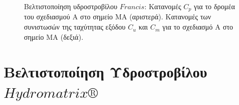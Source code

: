 \begin{figure}[h!]
\begin{minipage}[b]{0.5\linewidth}
 \centering
\end{minipage}
\begin{minipage}[b]{0.5\linewidth}
 \centering
\end{minipage}
\caption{Βελτιστοποίηση υδροστροβίλου $Francis$:  Κατανομές $C_p$ για το δρομέα του σχεδιασμού Α στο σημείο ΜΑ (αριστερά). Κατανομές των συνιστωσών της ταχύτητας εξόδου $C_u$ και $C_m$ για το σχεδιασμό Α στο σημείο ΜΑ (δεξιά).}
\label{Francis-A-cp}
\end{figure}

\FloatBarrier

\section{Βελτιστοποίηση Υδροστροβίλου $Hydromatrix\circledR$}

